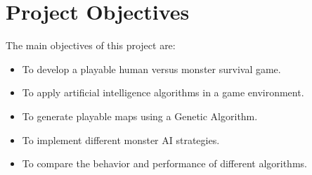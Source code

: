 \section{Project Objectives}

The main objectives of this project are:

\begin{itemize}
    \item To develop a playable human versus monster survival game.
    \item To apply artificial intelligence algorithms in a game environment.
    \item To generate playable maps using a Genetic Algorithm.
    \item To implement different monster AI strategies.
    \item To compare the behavior and performance of different algorithms.
\end{itemize}
